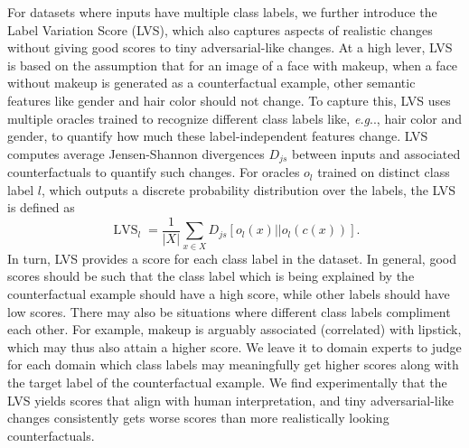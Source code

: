 \documentclass[11pt,a4paper,twoside,openright,final]{memoir}
\makeatletter
\DeclareRobustCommand\onedot{\futurelet\@let@token\@onedot}
\def\@onedot{\ifx\@let@token.\else.\null\fi\xspace}
\def\eg{\emph{e.g}\onedot} \def\Eg{\emph{E.g}\onedot}
\makeatother
\begin{document}
For datasets where inputs have multiple class labels, we further introduce the Label Variation Score (LVS), which also captures aspects of realistic changes without giving good scores to tiny adversarial-like changes.
At a high lever, LVS is based on the assumption that for an image of a face with makeup, when a face without makeup is generated as a counterfactual example, other semantic features like gender and hair color should not change.
To capture this, LVS uses multiple oracles trained to recognize different class labels like, \eg, hair color and gender, to quantify how much these label-independent features change. 
LVS computes average Jensen-Shannon divergences $D_{js}$ between inputs and associated counterfactuals to quantify such changes.
For oracles $o_l$ trained on distinct class label $l$, which outputs a discrete probability distribution over the labels, the LVS is defined as 
\begin{equation}\label{eq:lvs}
   \operatorname{LVS}_l = \frac{1}{|X|} \sum_{x \in X} D_{js}\left[ o_l(x) || o_l(c(x))\right].
\end{equation}
In turn, LVS provides a score for each class label in the dataset.
In general, good scores should be such that the class label which is being explained by the counterfactual example should have a high score, while other labels should have low scores.
There may also be situations where different class labels compliment each other. 
For example, makeup is arguably associated (correlated) with lipstick, which may thus also attain a higher score.
We leave it to domain experts to judge for each domain which class labels may meaningfully get higher scores along with the target label of the counterfactual example. 
We find experimentally that the LVS yields scores that align with human interpretation, and tiny adversarial-like changes consistently gets worse scores than more realistically looking counterfactuals.
\end{document}
